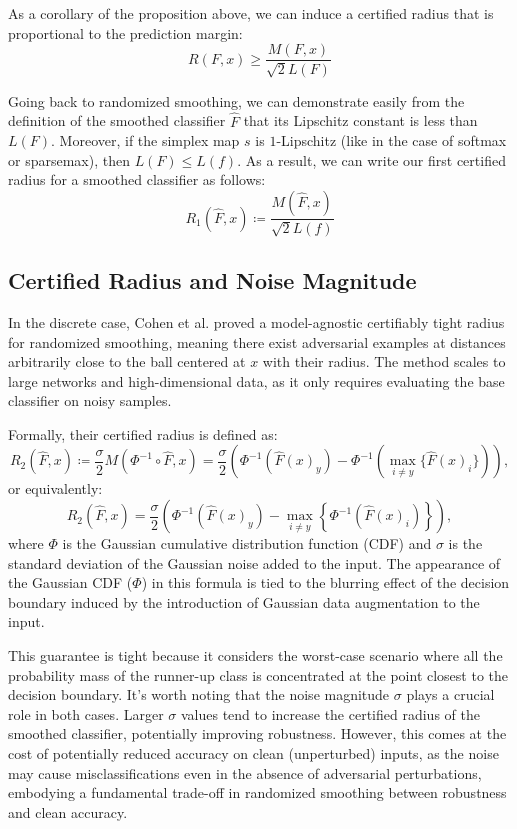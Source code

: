 As a corollary of the proposition above, we can induce a certified radius that is proportional to the prediction margin:
\[
    R(F,x) \geq \frac{M(F,x)}{\sqrt{2}L(F)}
\]

Going back to randomized smoothing, we can demonstrate easily from the definition of the smoothed classifier $\hat{F}$ that its Lipschitz constant is less than $L(F)$.
Moreover, if the simplex map $s$ is $1$-Lipschitz (like in the case of softmax or sparsemax), then $L(F)\leq L(f)$.
As a result, we can write our first certified radius for a smoothed classifier as follows:
\begin{equation}
    R_1(\hat{F},x) \coloneqq \frac{M(\hat{F},x)}{\sqrt{2}L(f)}\label{eq:first-radius}
\end{equation}

\subsection{Certified Radius and Noise Magnitude}\label{subsec:certified-radius-and-noise-magnitude}
In the discrete case, Cohen et al.
proved a model-agnostic certifiably tight radius for randomized smoothing, meaning there exist adversarial examples at distances arbitrarily close to the ball centered at $x$ with their radius.
The method scales to large networks and high-dimensional data, as it only requires evaluating the base classifier on noisy samples.

Formally, their certified radius is defined as:
\begin{equation}
    R_2(\hat{F},x) \coloneqq \frac{\sigma}{2}M(\Phi^{-1}\circ\hat{F},x)=\frac{\sigma}{2}\left(\Phi^{-1}(\hat{F}(x)_{y})-\Phi^{-1}(\max_{i \neq y}\{ \hat{F}(x)_i \})\right),\label{eq:second-radius}
\end{equation}
or equivalently:
\[
    R_2(\hat{F},x) =\frac{\sigma}{2}\left(\Phi^{-1}(\hat{F}(x)_{y})-\max_{i \neq y}\left\{  \Phi^{-1}( \hat{F}(x)_i)\right\}\right),
\]
where $\Phi$ is the Gaussian cumulative distribution function (CDF) and $\sigma$ is the standard deviation of the Gaussian noise added to the input.
The appearance of the Gaussian CDF ($\Phi$) in this formula is tied to the blurring effect of the decision boundary induced by the introduction of Gaussian data augmentation to the input.

This guarantee is tight because it considers the worst-case scenario where all the probability mass of the runner-up class is concentrated at the point closest to the decision boundary.
It's worth noting that the noise magnitude $\sigma$ plays a crucial role in both cases.
Larger $\sigma$ values tend to increase the certified radius of the smoothed classifier, potentially improving robustness.
However, this comes at the cost of potentially reduced accuracy on clean (unperturbed) inputs, as the noise may cause misclassifications even in the absence of adversarial perturbations, embodying a fundamental trade-off in randomized smoothing between robustness and clean accuracy.